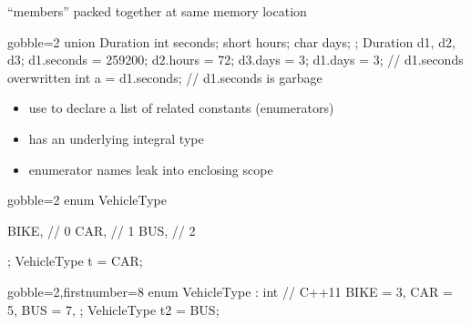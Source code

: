 \begin{frame}[fragile]
  \begin{mdframed}[style=simplebox]
    \center ``members'' packed together at same memory location
  \end{mdframed}
  \begin{multicols}{2}
    \begin{cppcode*}{gobble=2}
      union Duration {
        int seconds;
        short hours;
        char days;
      };
      Duration d1, d2, d3;
      d1.seconds = 259200;
      d2.hours = 72;
      d3.days = 3;
      d1.days = 3; // d1.seconds overwritten
      int a = d1.seconds; // d1.seconds is garbage
    \end{cppcode*}
    \pause
    \columnbreak
    \null \vfill
    \vfill \null
  \end{multicols}
\end{frame}

\begin{frame}[fragile]
  \begin{block}{}
    \begin{itemize}
        \item use to declare a list of related constants (enumerators)
        \item has an underlying integral type
        \item enumerator names leak into enclosing scope
    \end{itemize}
  \end{block}
  \begin{multicols}{2}
    \begin{cppcode*}{gobble=2}
      enum VehicleType {

        BIKE,  // 0
        CAR,   // 1
        BUS,   // 2
      };
      VehicleType t = CAR;
    \end{cppcode*}
    \columnbreak
    \begin{cppcode*}{gobble=2,firstnumber=8}
      enum VehicleType
        : int { // C++11
        BIKE = 3,
        CAR = 5,
        BUS = 7,
      };
      VehicleType t2 = BUS;
    \end{cppcode*}
  \end{multicols}
\end{frame}


